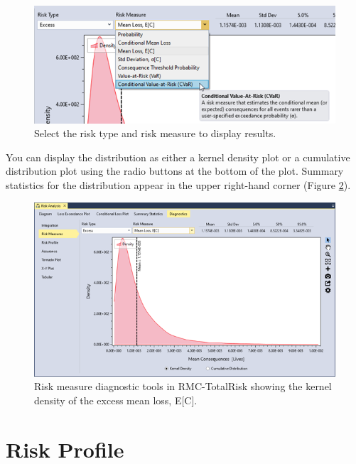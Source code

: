 \documentclass[
]{book}
\begin{document}
\begin{figure}

{\centering \includegraphics{images/figure144} 

}

\caption{Select the risk type and risk measure to display results.}\label{fig:figure-144}
\end{figure}

You can display the distribution as either a kernel density plot or a cumulative distribution plot using the radio buttons at the bottom of the plot. Summary statistics for the distribution appear in the upper right-hand corner (Figure \ref{fig:figure-145}).

\begin{figure}

{\centering \includegraphics{images/figure145} 

}

\caption{Risk measure diagnostic tools in RMC-TotalRisk showing the kernel density of the excess mean loss, E[C].}\label{fig:figure-145}
\end{figure}

\hypertarget{risk-profile}{%
\section{Risk Profile}\label{risk-profile}}
\end{document}

